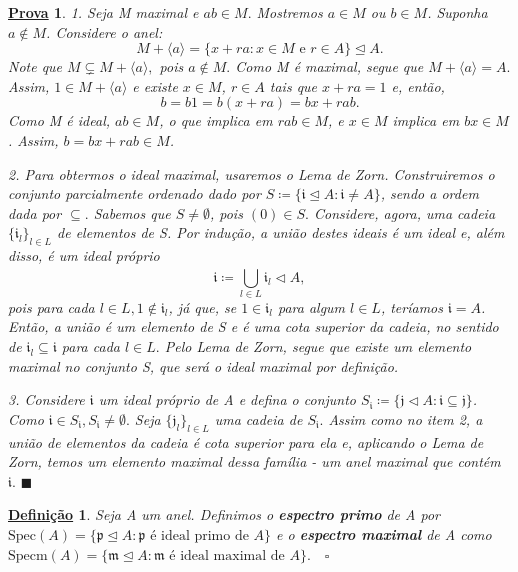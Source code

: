 \documentclass{article}
\newtheorem*{def*}{\underline{Defini\c c\~ao}}
\newtheorem*{proof*}{\underline{Prova}}
\renewcommand\qedsymbol{$\blacksquare$}
\begin{document}
\begin{proof*}
  1. Seja M maximal e \(ab\in M.\) Mostremos \(a\in M\) ou \(b\in M\). Suponha
  \(a\not\in M\). Considere o anel:
  \[
    M + \langle a \rangle = \{x+ra: x\in M\text{ e }r\in A\} \trianglelefteq{A}.
  \] 
  Note que \(M\subsetneq{M + \langle a \rangle},\) pois \(a\not\in M.\) Como M é maximal, segue que
  \(M + \langle a \rangle = A.\) Assim, \(1\in M + \langle a \rangle\) e existe \(x\in M\), \(r\in A\)
  tais que \(x + ra = 1\) e, então, 
  \[
    b = b1 = b(x+ra) = bx + rab.
  \]
  Como M é ideal, \(ab\in M\), o que implica em \(rab\in M\), e \(x\in M\) implica em \(bx\in M\).
  Assim, \(b = bx + rab\in M\). 

  2. Para obtermos o ideal maximal, usaremos o Lema de Zorn. Construiremos o conjunto parcialmente ordenado 
  dado por \(S\coloneqq \{\mathfrak{i}\trianglelefteq{A}: \mathfrak{i}\neq A\}\), sendo a ordem dada por \(\subseteq{}.\)
  Sabemos que \(S \neq\emptyset\), pois \((0)\in S.\) Considere, agora, uma cadeia \(\{\mathfrak{i}_{l}\}_{l\in L}\) de elementos
  de S. Por indução, a união destes ideais é um ideal e, além disso, é um ideal próprio
  \[
    \mathfrak{i}\coloneqq \bigcup_{l\in L}^{}{\mathfrak{i}_{l}}\vartriangleleft{A},
  \]
  pois para cada \(l\in L, 1\not\in \mathfrak{i}_{l}\), já que, se \(1\in \mathfrak{i}_{l}\) para algum \(l\in L\), teríamos
  \(\mathfrak{i} = A\). Então, a união é um elemento de S e é uma cota superior da cadeia, no sentido de \(\mathfrak{i}_{l}\subseteq{\mathfrak{i}}\)
  para cada \(l\in L.\) Pelo Lema de Zorn, segue que existe um elemento maximal no conjunto S, que será o ideal maximal por definição.

  3. Considere \(\mathfrak{i}\) um ideal próprio de A e defina o conjunto \(S_{\mathfrak{i}}\coloneqq \{\mathfrak{j}\vartriangleleft{A}:\mathfrak{i}\subseteq{\mathfrak{j}}\}\).
  Como \(\mathfrak{i}\in S_{\mathfrak{i}}, S_{\mathfrak{i}}\neq\emptyset.\) Seja \(\{\mathfrak{j}_{l}\}_{l\in L}\) uma cadeia de \(S_{\mathfrak{i}}.\)
  Assim como no item 2, a união de elementos da cadeia é cota superior para ela e, aplicando o Lema de Zorn, temos um elemento
  maximal dessa família - um anel maximal que contém \(\mathfrak{i}.\) 
  \qedsymbol
\end{proof*}
\begin{def*}
  Seja A um anel. Definimos o \textbf{espectro primo} de A por \(\mathrm{Spec}(A) = \{\mathfrak{p}\trianglelefteq{A}: \mathfrak{p}\text{ é ideal primo de } A\}\)
  e o \textbf{espectro maximal} de A como \(\mathrm{Specm}(A) = \{\mathfrak{m}\trianglelefteq{A}:\mathfrak{m} \text{ é ideal maximal de } A\}.\quad\square\)
\end{def*}
\end{document}
